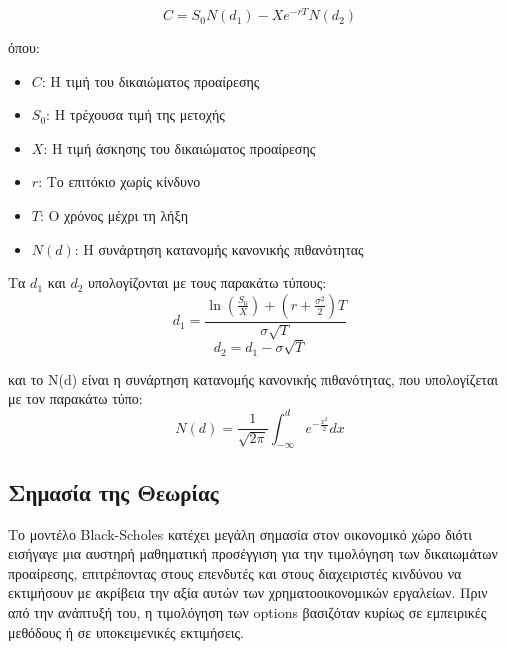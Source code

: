 \begin{equation}
    C = S_0 N(d_1) - X e^{-rT} N(d_2)
\end{equation}

όπου:
\begin{itemize}
    \item $C$: Η τιμή του δικαιώματος προαίρεσης
    \item $S_0$: Η τρέχουσα τιμή της μετοχής
    \item $X$: Η τιμή άσκησης του δικαιώματος προαίρεσης
    \item $r$: Το επιτόκιο χωρίς κίνδυνο
    \item $T$: Ο χρόνος μέχρι τη λήξη
    \item $N(d)$: Η συνάρτηση κατανομής κανονικής πιθανότητας
\end{itemize}

Τα $d_1$ και $d_2$ υπολογίζονται με τους παρακάτω τύπους:
\begin{equation}
    d_1 = \frac{\ln(\frac{S_0}{X}) + (r + \frac{\sigma^2}{2})T}{\sigma \sqrt{T}}
\end{equation}
\begin{equation}
    d_2 = d_1 - \sigma \sqrt{T}
\end{equation}

και το N(d) είναι η συνάρτηση κατανομής κανονικής πιθανότητας, που υπολογίζεται με τον παρακάτω τύπο:
\begin{equation}
    N(d) = \frac{1}{\sqrt{2\pi}} \int_{-\infty}^{d} e^{-\frac{x^2}{2}} dx
\end{equation}

\subsection{Σημασία της Θεωρίας}
Το μοντέλο Black-Scholes κατέχει μεγάλη σημασία στον οικονομικό χώρο διότι εισήγαγε μια αυστηρή μαθηματική προσέγγιση για την τιμολόγηση των δικαιωμάτων προαίρεσης,
επιτρέποντας στους επενδυτές και στους διαχειριστές κινδύνου να εκτιμήσουν με ακρίβεια την αξία αυτών των χρηματοοικονομικών εργαλείων.
Πριν από την ανάπτυξή του, η τιμολόγηση των options βασιζόταν κυρίως σε εμπειρικές μεθόδους ή σε υποκειμενικές εκτιμήσεις.

